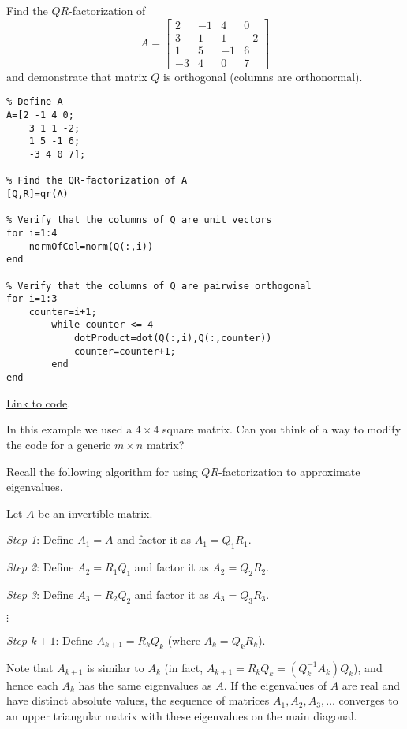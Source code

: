 \documentclass{ximera}
\begin{document}
\begin{example}\label{ex:qrOrthonormalQ}
Find the $QR$-factorization of 
$$A=\begin{bmatrix}2 & -1 & 4 & 0\\
    3 & 1 & 1 & -2\\
    1 & 5 & -1 & 6\\
    -3 & 4 & 0 & 7\end{bmatrix}$$
and demonstrate that matrix $Q$ is orthogonal (columns are orthonormal).     
\begin{explanation}
    \begin{verbatim}
% Define A
A=[2 -1 4 0;
    3 1 1 -2;
    1 5 -1 6;
    -3 4 0 7];

% Find the QR-factorization of A
[Q,R]=qr(A)

% Verify that the columns of Q are unit vectors
for i=1:4
    normOfCol=norm(Q(:,i))
end    

% Verify that the columns of Q are pairwise orthogonal
for i=1:3
    counter=i+1;
        while counter <= 4
            dotProduct=dot(Q(:,i),Q(:,counter))
            counter=counter+1;
        end
end
    \end{verbatim}
  
\href{https://sagecell.sagemath.org/?z=eJyNT8FOwzAMvVfqP_gyqROtRNYC0iCHCsQVugOXaYeodailLoY0ZYKvJ1kzDW57PtiW_d6zF_CEmgxCnSa13K6gEFDB9X2agEcJwkexiq2AmzC_jW1RhlW42_k-TRbwTKYD1yM0m0Kr1rGlH-WIDbAO-tsm3-zkp83q5Ux4Q0v621OUO_JaHqa9GcN6A8oiTIYcfGGQGtNEswWSYl3N9obt_kU_8iBDlTXZOqelV0Z_hceFFh-K7IFGBLau53c2ajg7lbNTy5NxaCVdifh6wKGnAU8zeJBQnWcBHbtXy93UOunLeF8eUuSEY_8STjYx_zPzTx0_-wUZ_XQT&lang=octave&interacts=eJyLjgUAARUAuQ==}{Link to code}.
\end{explanation}  
In this example we used a $4\times 4$ square matrix.  Can you think of a way to modify the code for a generic $m\times n$ matrix?
\end{example}

Recall the following algorithm for using $QR$-factorization to approximate eigenvalues.

\begin{algorithm}[\ref{alg:qrEig}]
Let $A$ be an invertible matrix.

\emph{Step 1}: Define $A_{1} = A$ and factor it as $A_{1} = Q_{1}R_{1}$.

\emph{Step 2}: Define $A_{2} = R_{1}Q_{1}$ and factor it as $A_{2} = Q_{2}R_{2}$.

\emph{Step 3}: Define $A_{3} = R_{2}Q_{2}$ and factor it as $A_{3} = Q_{3}R_{3}$.

 $\vdots$
 
\emph{Step $k+1$}: Define $A_{k + 1} = R_{k}Q_{k}$ (where $A_{k} = Q_{k}R_{k}$). 

Note that $A_{k + 1}$ is similar to $A_{k}$ (in fact, $A_{k+1} = R_{k}Q_{k} = (Q_{k}^{-1}A_{k})Q_{k}$), and hence each $A_{k}$ has the same eigenvalues as $A$. If the eigenvalues of $A$ are real and have distinct absolute values, the sequence of matrices $A_{1}, A_{2}, A_{3}, \dots$ converges to an upper triangular matrix with these eigenvalues on the main diagonal. 
\end{algorithm}
\end{document}
